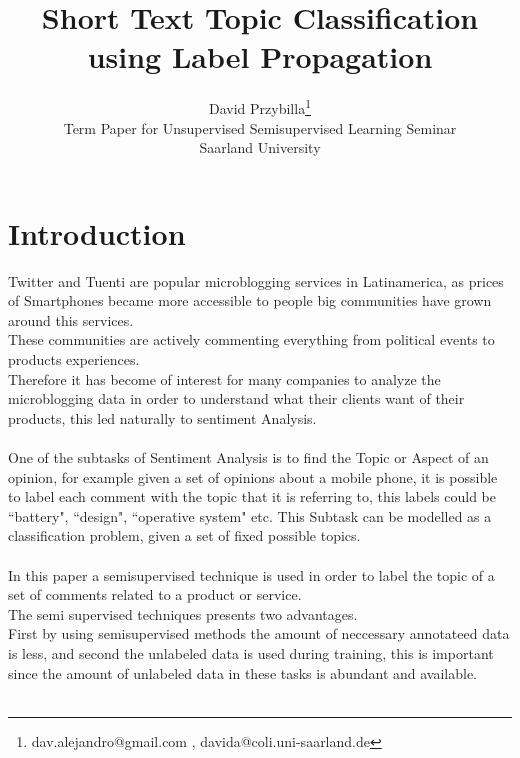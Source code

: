 \documentclass[4pt,a4paper,twocolumn]{article}
\author{David Przybilla\footnote{dav.alejandro@gmail.com , davida@coli.uni-saarland.de}\\ Term Paper for Unsupervised Semisupervised
Learning Seminar\\ Saarland University}
\title{Short Text Topic Classification using Label Propagation}
\begin{document}
\twocolumn[
	 \begin{@twocolumnfalse}
    \maketitle
    \begin{abstract}
      ...
    \end{abstract}
  \end{@twocolumnfalse}
  ]




\part*{Introduction}
Twitter and Tuenti are popular microblogging services in Latinamerica,
as prices of Smartphones became more accessible to people big communities
have grown around this services.\\
These communities are actively commenting everything from political events to products experiences.\\
Therefore it has become of interest for many companies to analyze the microblogging data in order to understand
what their clients want of their products, this led naturally to sentiment Analysis.\\ 
\\
One of the subtasks of Sentiment Analysis is to find the Topic or Aspect of an opinion,
for example given a set of opinions about a mobile phone, it is possible to label each comment
with the topic that it is referring to, this labels could be ``battery", ``design", ``operative system" etc.
This Subtask can be modelled as a classification problem, given a set of fixed possible topics.\\
\\
In this paper a semisupervised technique is used in order to label the topic of a set of comments 
related to a product or service.\\
The semi supervised techniques presents two advantages.\\
First by using semisupervised methods the amount of neccessary annotateed data is less,
and second the unlabeled data is used during training, this is important since the amount of unlabeled data in these tasks is abundant and available.\\
\\
\end{document}
